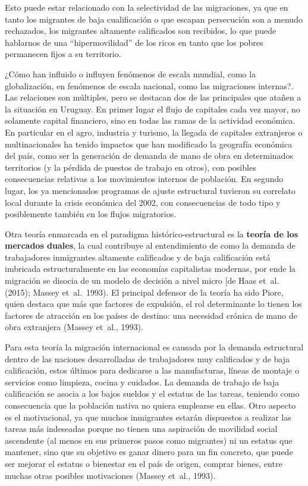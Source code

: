 \documentclass[12pt,spanish,]{article}
\begin{document}
Esto puede estar relacionado con la selectividad de las migraciones, ya
que en tanto los migrantes de baja cualificación o que escapan
persecución son a menudo rechazados, los migrantes altamente calificados
son recibidos, lo que puede hablarnos de una ``hipermovilidad'' de los
ricos en tanto que los pobres permanecen fijos a su territorio.

¿Cómo han influido o influyen fenómenos de escala mundial, como la
globalización, en fenómenos de escala nacional, como las migraciones
internas?. Las relaciones son múltiples, pero se destacan dos de las
principales que atañen a la situación en Uruguay. En primer lugar el
flujo de capitales cada vez mayor, no solamente capital financiero, sino
en todas las ramas de la actividad económica. En particular en el agro,
industria y turismo, la llegada de capitales extranjeros o
multinacionales ha tenido impactos que han modificado la geografía
económica del país, como ser la generación de demanda de mano de obra en
determinados territorios (y la pérdida de puestos de trabajo en otros),
con posibles consecuencias relativas a los movimientos internos de
población. En segundo lugar, los ya mencionados programas de ajuste
estructural tuvieron su correlato local durante la crisis económica del
2002, con consecuencias de todo tipo y posiblemente también en los
flujos migratorios.

Otra teoría enmarcada en el paradigma histórico-estructural es la
\textbf{teoría de los mercados duales}, la cual contribuye al
entendimiento de como la demanda de trabajadores inmigrantes altamente
calificados y de baja calificación está imbricada estructuralmente en
las economías capitalistas modernas, por ende la migración se disocia de
un modelo de decisión a nivel micro {[}de Haas et~al. (2015); Massey
et~al.~1993). El principal defensor de la teoría ha sido Piore, quien
destaca que más que factores de expulsión, el rol determinante lo tienen
los factores de atracción en los países de destino: una necesidad
crónica de mano de obra extranjera (Massey et~al., 1993).

Para esta teoría la migración internacional es causada por la demanda
estructural dentro de las naciones desarrolladas de trabajadores muy
calificados y de baja calificación, estos últimos para dedicarse a las
manufacturas, líneas de montaje o servicios como limpieza, cocina y
cuidados. La demanda de trabajo de baja calificación se asocia a los
bajos sueldos y el estatus de las tareas, teniendo como consecuencia que
la población nativa no quiera emplearse en ellas. Otro aspecto es el
motivacional, ya que muchos inmigrantes estarán dispuestos a realizar
las tareas más indeseadas porque no tienen una aspiración de movilidad
social ascendente (al menos en sus primeros pasos como migrantes) ni un
estatus que mantener, sino que su objetivo es ganar dinero para un fin
concreto, que puede ser mejorar el estatus o bienestar en el país de
origen, comprar bienes, entre muchas otras posibles motivaciones (Massey
et~al., 1993).
\end{document}
